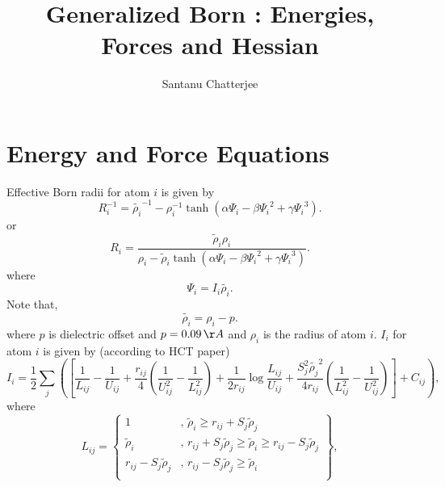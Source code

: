 \documentclass[12pt]{article}
\title{Generalized Born : Energies, Forces and Hessian}
\author{Santanu Chatterjee}
\date{}
\begin{document}
\maketitle

\section{Energy and Force Equations}

Effective Born radii for atom $i$ is given by
\begin{equation}
R_{i}^{-1} = \tilde{{\rho}_i}^{-1} - {\rho}_{i}^{-1}\tanh({\alpha}{\Psi_{i}}-{\beta}{\Psi_{i}}^{2} + {\gamma}{\Psi_{i}}^{3}).
\end{equation}
or
\begin{equation}
R_{i} = \frac{\tilde{\rho}_{i}{\rho}_{i}}{{\rho}_{i} - \tilde{\rho}_{i}\tanh({\alpha}{\Psi_{i}}-{\beta}{\Psi_{i}}^{2} + {\gamma}{\Psi_{i}}^{3})}.
\end{equation}
where 
\begin{equation}
\label{psiequation}
{\Psi}_{i} = I_{i}\tilde{{\rho}_i}.
\end{equation}
Note that, 
\begin{equation}
\tilde{{\rho}_i} = {\rho}_{i} - p.
\end{equation}
where $p$ is dielectric offset and $p=0.09{\,}\AA$ and ${\rho}_{i}$ is the
radius of atom $i$.
$I_{i}$ for atom $i$ is given by (according to HCT paper) 
\begin{equation}
\label{burialterm}
I_{i} = \frac{1}{2}\displaystyle\sum_{j}\left(\left[\frac{1}{L_{ij}} - \frac{1}{U_{ij}} + \frac{r_{ij}}{4}\left(
  \frac{1}{U_{ij}^{2}} - \frac{1}{L_{ij}^{2}}\right) + \frac{1}{2r_{ij}}\log{\frac{L_{ij}}{U_{ij}}} + 
   \frac{S_{j}^{2}\tilde{{\rho}_{j}}^{2}}{4r_{ij}}\left(\frac{1}{L_{ij}^{2}} - \frac{1}{U_{ij}^{2}}\right)\right] + C_{ij}\right),
\end{equation}
where
\begin{equation}
\label{Lijeqn}
L_{ij} = \left\{ \begin{array}{rl}
    1 &\mbox{, $\tilde{\rho}_{i} {\geq} r_{ij} + S_{j}\tilde{\rho}_{j}$} \\
    \tilde{\rho}_{i} &\mbox{, $r_{ij} + S_{j}\tilde{\rho}_{j} {\geq} \tilde{\rho}_{i} {\geq} r_{ij} - S_{j}\tilde{\rho}_{j}$} \\
    r_{ij} - S_{j}\tilde{\rho}_{j} &\mbox{, $r_{ij} - S_{j}\tilde{\rho}_{j} {\geq} \tilde{\rho}_{i}$ } \\
        \end{array} \right\},
\end{equation}
\end{document}
